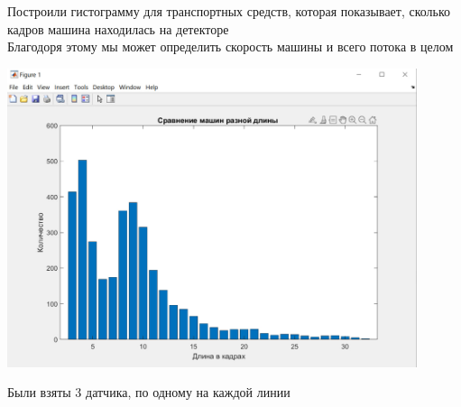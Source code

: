 \documentclass[a4paper,12pt]{article}
\begin{document}
Построили гистограмму для транспортных средств, которая показывает, сколько кадров машина находилась на детекторе\\
Благодоря этому мы может определить скорость машины и всего потока в целом
\begin{center}
\includegraphics[width=0.9\textwidth]{histogram.jpg}
\end{center}
\begin{center}
Были взяты 3 датчика, по одному на каждой линии
\end{center}

\newpage
\end{document}
